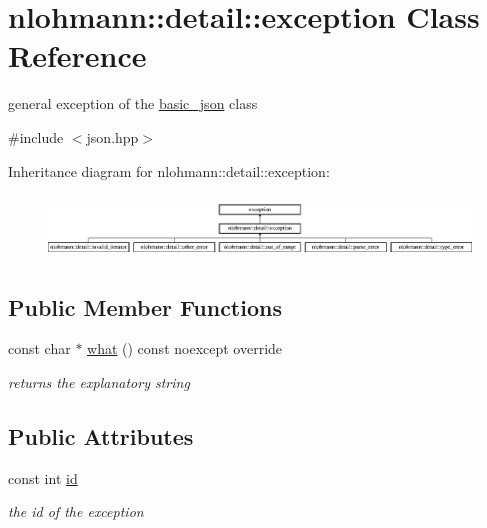 \hypertarget{classnlohmann_1_1detail_1_1exception}{}\section{nlohmann\+:\+:detail\+:\+:exception Class Reference}
\label{classnlohmann_1_1detail_1_1exception}


general exception of the \mbox{\hyperlink{classnlohmann_1_1basic__json}{basic\+\_\+json}} class  




{\ttfamily \#include $<$json.\+hpp$>$}

Inheritance diagram for nlohmann\+:\+:detail\+:\+:exception\+:\begin{figure}[H]
\begin{center}
\leavevmode
\includegraphics[height=1.680000cm]{de/df2/classnlohmann_1_1detail_1_1exception}
\end{center}
\end{figure}
\subsection*{Public Member Functions}
\begin{DoxyCompactItemize}
\item 
\mbox{\label{classnlohmann_1_1detail_1_1exception_a0672c25ecdf14d1a071d4d6478a65af0}} 
const char $\ast$ \mbox{\hyperlink{classnlohmann_1_1detail_1_1exception_a0672c25ecdf14d1a071d4d6478a65af0}{what}} () const noexcept override
\begin{DoxyCompactList}\small\item\em returns the explanatory string \end{DoxyCompactList}\end{DoxyCompactItemize}
\subsection*{Public Attributes}
\begin{DoxyCompactItemize}
\item 
\mbox{\label{classnlohmann_1_1detail_1_1exception_a0d4589a3fb54e81646d986c05efa3b9a}} 
const int \mbox{\hyperlink{classnlohmann_1_1detail_1_1exception_a0d4589a3fb54e81646d986c05efa3b9a}{id}}
\begin{DoxyCompactList}\small\item\em the id of the exception \end{DoxyCompactList}\end{DoxyCompactItemize}
